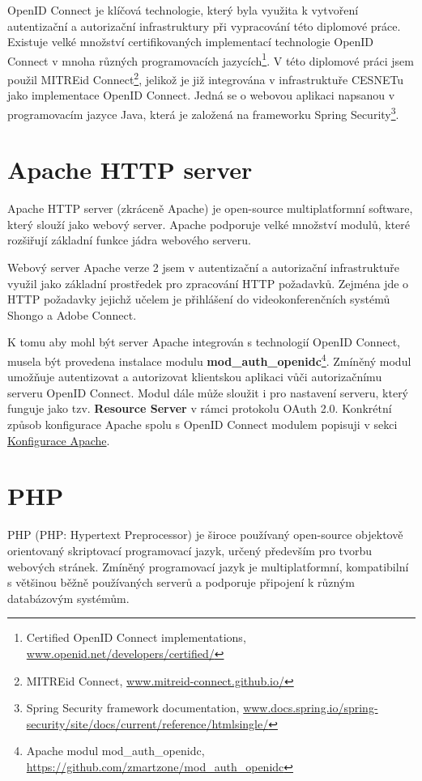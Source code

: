 \documentclass[
  printed, %
  twoside, %
  table,   %
  nolof,     %
  nolot,     %
]{fithesis3}
\begin{document}
\par
OpenID Connect je klíčová technologie, který byla využita k vytvoření autentizační a autorizační infrastruktury při vypracování této diplomové práce. Existuje velké množství certifikovaných implementací technologie OpenID Connect v mnoha různých programovacích jazycích\footnote{Certified OpenID Connect implementations, \url{www.openid.net/developers/certified/}}. V této diplomové práci jsem použil MITREid Connect\footnote{MITREid Connect, \url{www.mitreid-connect.github.io/}}, jelikož je již integrována v infrastruktuře CESNETu jako implementace OpenID Connect. Jedná se o webovou aplikaci napsanou v programovacím jazyce Java, která je založená na frameworku Spring Security\footnote{Spring Security framework documentation, \url{www.docs.spring.io/spring-security/site/docs/current/reference/htmlsingle/}}. 

\section{Apache HTTP server}
Apache HTTP server \cite{apache} (zkráceně Apache) je open-source multiplatformní software, který slouží jako webový server. Apache podporuje velké množství modulů, které rozšiřují základní funkce jádra webového serveru.  \par

Webový server Apache verze 2 jsem v autentizační a autorizační infrastruktuře využil jako základní prostředek pro zpracování HTTP požadavků. Zejména jde o HTTP požadavky jejichž učelem je přihlášení do videokonferenčních systémů Shongo a Adobe Connect. 
\par
K tomu aby mohl být server Apache integrován s technologií OpenID Connect, musela být provedena instalace modulu \textbf{mod\_auth\_openidc}\footnote{Apache modul mod\_auth\_openidc, \url{https://github.com/zmartzone/mod\_auth\_openidc}}. Zmíněný modul umožňuje autentizovat a autorizovat klientskou aplikaci vůči autorizačnímu serveru OpenID Connect. Modul dále může sloužit i pro nastavení serveru, který funguje jako tzv. \textbf{Resource Server} v rámci protokolu OAuth 2.0. Konkrétní způsob konfigurace Apache spolu s OpenID Connect modulem popisuji v sekci \hyperref[apacheConfig]{Konfigurace Apache}.

\section{PHP}
PHP \cite{php5} (PHP: Hypertext Preprocessor) je široce používaný open-source objektově orientovaný skriptovací programovací jazyk, určený především pro tvorbu webových stránek. Zmíněný programovací jazyk je multiplatformní, kompatibilní s většinou běžně používaných serverů a podporuje připojení k různým databázovým systémům. 
\par
\end{document}
